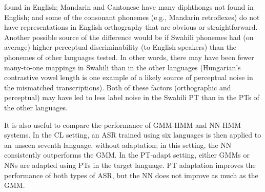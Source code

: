 found in English; Mandarin and 
Cantonese have many diphthongs not found in English; and some of the 
consonant phonemes (e.g., Mandarin retroflexes) do not have 
representations in English orthography that are obvious or 
straightforward. Another possible source of the difference would be if
Swahili phonemes had (on average) higher perceptual discriminability 
(to English speakers) than the phonemes of other languages tested. In
other words, there may have been fewer many-to-one mappings in Swahili
than in the other languages (Hungarian's contrastive vowel length is one
example of a likely source of perceptual noise in the mismatched 
transcriptions). Both of these factors (orthographic and 
perceptual) may have led to less label noise in the Swahili PT than in 
the PTs of the other languages. 

It is also useful to compare the performance of GMM-HMM and NN-HMM
systems.  In the {\sc CL} setting, an ASR trained
using six languages is then applied to an unseen seventh language,
without adaptation; in this setting, the NN consistently outperforms
the GMM.  In the {\sc PT-adapt} setting, either GMMs or NNs are
adapted using PTs in the target language.  PT adaptation improves the
performance of both types of ASR, but the NN does not improve as much
as the GMM.

